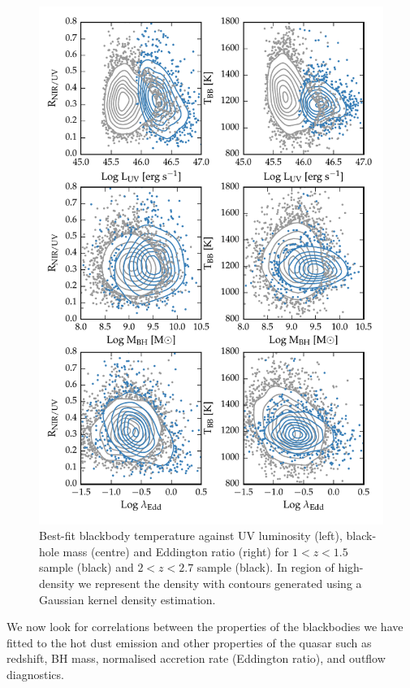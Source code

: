 \begin{figure}
  \centering
  \includegraphics[width=\textwidth]{figures/chapter05/correlations_contour.pdf}
  \caption{Best-fit blackbody temperature against UV luminosity (left), black-hole mass (centre) and Eddington ratio (right) for $1 < z < 1.5$ sample (black) and $2 < z < 2.7$ sample (black). In region of high-density we represent the density with contours generated using a Gaussian kernel density estimation.  }
  \label{fig:correlations_contour}
\end{figure}

We now look for correlations between the properties of the blackbodies we have fitted to the hot dust emission and other properties of the quasar such as redshift, \ac{BH} mass, normalised accretion rate (Eddington ratio), and outflow diagnostics.  

